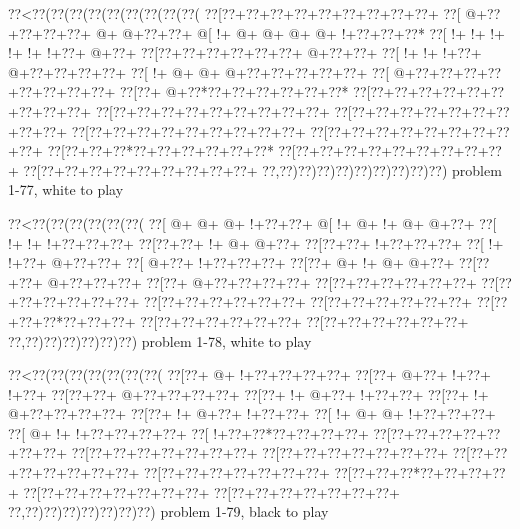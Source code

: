 \vbox{\vbox{\goo
\0??<\0??(\0??(\0??(\0??(\0??(\0??(\0??(\0??(\0??(
\0??[\0??+\0??+\0??+\0??+\0??+\0??+\0??+\0??+\0??+
\0??[\- @+\0??+\0??+\0??+\0??+\- @+\- @+\0??+\0??+
\- @[\- !+\- @+\- @+\- @+\- @+\- !+\0??+\0??+\0??*
\0??[\- !+\- !+\- !+\- !+\- !+\- !+\0??+\- @+\0??+
\0??[\0??+\0??+\0??+\0??+\0??+\0??+\- @+\0??+\0??+
\0??[\- !+\- !+\- !+\0??+\- @+\0??+\0??+\0??+\0??+
\0??[\- !+\- @+\- @+\- @+\0??+\0??+\0??+\0??+\0??+
\0??[\- @+\0??+\0??+\0??+\0??+\0??+\0??+\0??+\0??+
\0??[\0??+\- @+\0??*\0??+\0??+\0??+\0??+\0??+\0??*
\0??[\0??+\0??+\0??+\0??+\0??+\0??+\0??+\0??+\0??+
\0??[\0??+\0??+\0??+\0??+\0??+\0??+\0??+\0??+\0??+
\0??[\0??+\0??+\0??+\0??+\0??+\0??+\0??+\0??+\0??+
\0??[\0??+\0??+\0??+\0??+\0??+\0??+\0??+\0??+\0??+
\0??[\0??+\0??+\0??+\0??+\0??+\0??+\0??+\0??+\0??+
\0??[\0??+\0??+\0??*\0??+\0??+\0??+\0??+\0??+\0??*
\0??[\0??+\0??+\0??+\0??+\0??+\0??+\0??+\0??+\0??+
\0??[\0??+\0??+\0??+\0??+\0??+\0??+\0??+\0??+\0??+
\0??,\0??)\0??)\0??)\0??)\0??)\0??)\0??)\0??)\0??)
}
\hfil problem 1-77, white to play\hfil\break
}

\vbox{\vbox{\goo
\0??<\0??(\0??(\0??(\0??(\0??(\0??(
\0??[\- @+\- @+\- @+\- !+\0??+\0??+
\- @[\- !+\- @+\- !+\- @+\- @+\0??+
\0??[\- !+\- !+\- !+\0??+\0??+\0??+
\0??[\0??+\0??+\- !+\- @+\- @+\0??+
\0??[\0??+\0??+\- !+\0??+\0??+\0??+
\0??[\- !+\- !+\0??+\- @+\0??+\0??+
\0??[\- @+\0??+\- !+\0??+\0??+\0??+
\0??[\0??+\- @+\- !+\- @+\- @+\0??+
\0??[\0??+\0??+\- @+\0??+\0??+\0??+
\0??[\0??+\- @+\0??+\0??+\0??+\0??+
\0??[\0??+\0??+\0??+\0??+\0??+\0??+
\0??[\0??+\0??+\0??+\0??+\0??+\0??+
\0??[\0??+\0??+\0??+\0??+\0??+\0??+
\0??[\0??+\0??+\0??+\0??+\0??+\0??+
\0??[\0??+\0??+\0??*\0??+\0??+\0??+
\0??[\0??+\0??+\0??+\0??+\0??+\0??+
\0??[\0??+\0??+\0??+\0??+\0??+\0??+
\0??,\0??)\0??)\0??)\0??)\0??)\0??)
}
\hfil problem 1-78, white to play\hfil\break
}

\vbox{\vbox{\goo
\0??<\0??(\0??(\0??(\0??(\0??(\0??(\0??(
\0??[\0??+\- @+\- !+\0??+\0??+\0??+\0??+
\0??[\0??+\- @+\0??+\- !+\0??+\- !+\0??+
\0??[\0??+\0??+\- @+\0??+\0??+\0??+\0??+
\0??[\0??+\- !+\- @+\0??+\- !+\0??+\0??+
\0??[\0??+\- !+\- @+\0??+\0??+\0??+\0??+
\0??[\0??+\- !+\- @+\0??+\- !+\0??+\0??+
\0??[\- !+\- @+\- @+\- !+\0??+\0??+\0??+
\0??[\- @+\- !+\- !+\0??+\0??+\0??+\0??+
\0??[\- !+\0??+\0??*\0??+\0??+\0??+\0??+
\0??[\0??+\0??+\0??+\0??+\0??+\0??+\0??+
\0??[\0??+\0??+\0??+\0??+\0??+\0??+\0??+
\0??[\0??+\0??+\0??+\0??+\0??+\0??+\0??+
\0??[\0??+\0??+\0??+\0??+\0??+\0??+\0??+
\0??[\0??+\0??+\0??+\0??+\0??+\0??+\0??+
\0??[\0??+\0??+\0??*\0??+\0??+\0??+\0??+
\0??[\0??+\0??+\0??+\0??+\0??+\0??+\0??+
\0??[\0??+\0??+\0??+\0??+\0??+\0??+\0??+
\0??,\0??)\0??)\0??)\0??)\0??)\0??)\0??)
}
\hfil problem 1-79, black to play\hfil\break
}

